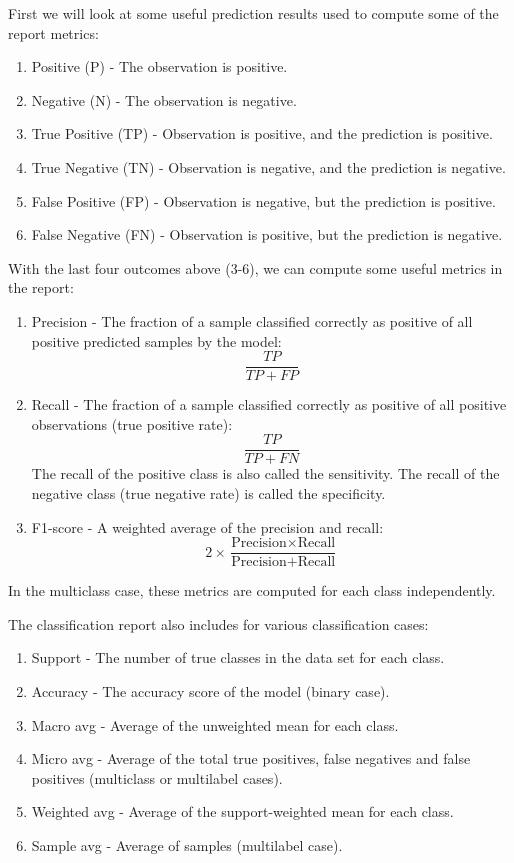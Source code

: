 \documentclass[a4paper, american, 12pt]{report}
\begin{document}
	First we will look at some useful prediction results used to compute some of the report metrics:
	\begin{enumerate}
		\item Positive (P) - The observation is positive.
		\item Negative (N) - The observation is negative.
		\item True Positive (TP) - Observation is positive, and the prediction is positive.
		\item True Negative (TN) - Observation is negative, and the prediction is negative.
		\item False Positive (FP) - Observation is negative, but the prediction is positive.
		\item False Negative (FN) - Observation is positive, but the prediction is negative.
	\end{enumerate}
	With the last four outcomes above (3-6), we can compute some useful metrics in the report:
	\begin{enumerate}
		\item[] Precision - The fraction of a sample classified correctly as positive of all positive predicted samples by the model:
		\[\frac{TP}{TP+FP}\]
		\item[] Recall - The fraction of a sample classified correctly as positive of all positive observations (true positive rate):
		\[\frac{TP}{TP+FN}\]
		The recall of the positive class is also called the sensitivity. The recall of the negative class (true negative rate) is called the specificity.
		\item[] F1-score - A weighted average of the precision and recall:
		\[2\times\frac{\text{Precision}\times \text{Recall}}{\text{Precision}+ \text{Recall}}\]
	\end{enumerate}
	In the multiclass case, these metrics are computed for each class independently. 
	
	The classification report also includes for various classification cases:
	\begin{enumerate}
		\item[] Support - The number of true classes in the data set for each class.
		\item[] Accuracy - The accuracy score of the model (binary case).
		\item[] Macro avg - Average of the unweighted mean for each class.
		\item[] Micro avg - Average of the total true positives, false negatives and false positives (multiclass or multilabel cases).
		\item[] Weighted avg - Average of the support-weighted mean for each class.
		\item[] Sample avg - Average of samples (multilabel case).
	\end{enumerate}
	
\end{document}
